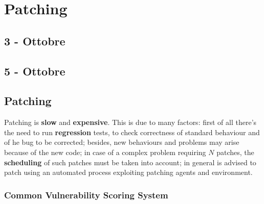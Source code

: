 \chapter{Patching}
\section*{3 - Ottobre}

\section*{5 - Ottobre}
\section{Patching}
Patching is \textbf{slow} and \textbf{expensive}.
This is due to many factors:
first of all there's the need to run \textbf{regression} tests, to check correctness of standard behaviour and of he bug to be corrected;
besides, new behaviours and problems may arise because of the new code;
in case of a complex problem requiring $N$ patches,
the \textbf{scheduling} of such patches must be taken into account;
in general is advised to patch using an automated process exploiting patching agents and environment.

\subsection{Common Vulnerability Scoring System}

